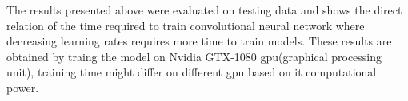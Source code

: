 The results presented above were evaluated on testing data and shows the 
direct relation of the time required to train convolutional neural network 
where decreasing learning rates requires more time to train models. These results 
are obtained by traing the model on Nvidia GTX-1080 gpu(graphical processing unit), training 
time might differ on different gpu based on it computational power.